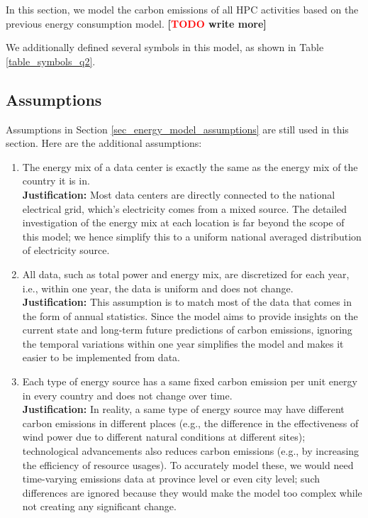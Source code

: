 \documentclass[12pt]{article}
\newcommand{\todo}[1]{\textbf{[\textcolor{red}{TODO} #1]}}
\begin{document}
In this section, we model the carbon emissions of all HPC activities based on the previous energy consumption model. \todo{write more}

We additionally defined several symbols in this model, as shown in Table \ref{table_symbols_q2}.

\subsection{Assumptions}

Assumptions in Section \ref{sec_energy_model_assumptions} are still used in this section. Here are the additional assumptions:

\begin{enumerate}
	\item The energy mix of a data center is exactly the same as the energy mix of the country it is in. \\
	\textbf{Justification:} Most data centers are directly connected to the national electrical grid, which's electricity comes from a mixed source. The detailed investigation of the energy mix at each location is far beyond the scope of this model; we hence simplify this to a uniform national averaged distribution of electricity source.

	\item All data, such as total power and energy mix, are discretized for each year, i.e., within one year, the data is uniform and does not change. \\
	\textbf{Justification:} This assumption is to match most of the data that comes in the form of annual statistics. Since the model aims to provide insights on the current state and long-term future predictions of carbon emissions, ignoring the temporal variations within one year simplifies the model and makes it easier to be implemented from data.

	\item Each type of energy source has a same fixed carbon emission per unit energy in every country and does not change over time. \\
	\textbf{Justification:} In reality, a same type of energy source may have different carbon emissions in different places (e.g., the difference in the effectiveness of wind power due to different natural conditions at different sites); technological advancements also reduces carbon emissions (e.g., by increasing the efficiency of resource usages). To accurately model these, we would need time-varying emissions data at province level or even city level; such differences are ignored because they would make the model too complex while not creating any significant change.


\end{enumerate}
\end{document}

